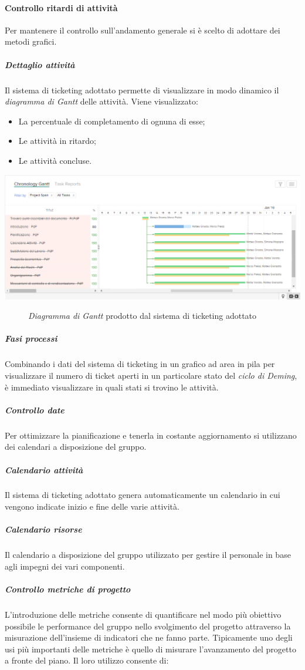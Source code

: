 	\paragraph{Controllo ritardi di attività}  Per mantenere il controllo sull'andamento generale si è scelto di adottare dei metodi grafici.
		\subparagraph{Dettaglio attività} Il sistema di ticketing adottato permette di visualizzare in modo dinamico il \textit{diagramma di  Gantt} delle attività. Viene visualizzato:
		\begin{itemize}
			\item La percentuale di completamento di ognuna di esse;
			\item Le attività in ritardo;
			\item Le attività concluse.
		\end{itemize}
		\begin{center}
			\includegraphics[keepaspectratio = true, width=16cm]{immagini/Norme_ZohoGantt.png}
		\end{center}
		\begin{figure}[h]
			\caption{\textit{Diagramma di Gantt} prodotto dal sistema di ticketing adottato}\label{etichetta}
		\end{figure}
		\subparagraph{Fasi processi}
		Combinando i dati del sistema di ticketing in un grafico ad area in pila per visualizzare il numero di ticket aperti in un particolare stato del \textit{ciclo di Deming}, è immediato visualizzare in quali stati si trovino le attività.
		\subparagraph{Controllo date} Per ottimizzare la pianificazione e tenerla in costante aggiornamento si utilizzano dei calendari a disposizione del gruppo.
		\subparagraph{Calendario attività}
		Il sistema di ticketing adottato genera automaticamente un calendario in cui vengono indicate inizio e fine delle varie attività.
		\subparagraph{Calendario risorse} Il calendario a disposizione del gruppo utilizzato per gestire il personale in base agli impegni dei vari componenti.
		\subparagraph{Controllo metriche di progetto} L'introduzione delle metriche consente di quantificare nel modo più obiettivo possibile le performance del gruppo nello svolgimento del progetto attraverso la misurazione dell'insieme di indicatori che ne fanno parte. Tipicamente uno degli usi più importanti delle metriche è quello di misurare l'avanzamento del progetto a fronte del piano. Il loro utilizzo consente di:
